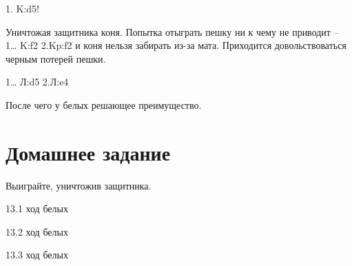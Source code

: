 1. K:d5!

Уничтожая защитника коня. Попытка отыграть пешку ни к чему не приводит – 1… K:f2 2.Kp:f2 и коня нельзя забирать из-за мата. Приходится довольствоваться черным потерей пешки.

1… Л:d5 2.Л:e4

После чего у белых решающее преимущество.

\section{Домашнее задание}

Выиграйте, уничтожив защитника. 
 
13.1 ход белых
 
13.2 ход белых
  
13.3 ход белых
